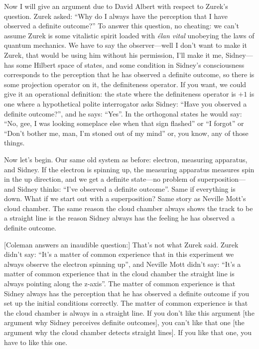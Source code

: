 \documentclass[twocolumn,prb]{revtex4}
\begin{document}
Now I will give an argument due to David Albert\cite{Albert94} with respect to Zurek's question. Zurek asked: ``Why do I always have the perception that I have observed a definite outcome?'' To answer this question, no cheating: we can't assume Zurek is some vitalistic spirit loaded with \emph{élan vital} unobeying the laws of quantum mechanics. We have to say the observer---well I don't want to make it Zurek, that would be using him without his permission, I'll make it me, Sidney---has some Hilbert space of states, and some condition in Sidney's consciousness corresponds to the perception that he has observed a definite outcome, so there is some projection operator on it, the definiteness operator.
If you want, we could give it an operational definition: the state
where the definiteness operator is $+1$ is one where a hypothetical polite interrogator asks Sidney: ``Have you observed a definite outcome?'', and he says: ``Yes''. In the orthogonal states he would say: ``No, gee, I was looking someplace else when that sign flashed'' or ``I forgot'' or ``Don't bother me, man, I'm stoned out of my mind'' or, you know, any of those things.

Now let's begin. Our same old system as before: electron, measuring apparatus, and Sidney. If the electron is spinning up, the measuring apparatus measures spin in the up direction, and we get a definite state---no problem of superposition---and Sidney thinks: ``I've observed a definite outcome''. Same if everything is down. What if we start out with a superposition? Same story as Neville Mott's cloud chamber. The same reason the cloud chamber always shows the track to be a straight line is the reason Sidney always has the feeling he has observed a definite outcome.


[Coleman answers an inaudible question:]
That's not what Zurek said. Zurek didn't say: ``It's a matter of common experience that in this experiment we always observe the electron spinning up'', and Neville Mott didn't say: ``It's a matter of common experience that in the cloud chamber the straight line is always pointing along the z-axis''. The matter of common experience is that Sidney always has the perception that he has observed a definite outcome if you set up the initial conditions correctly. The matter of common experience is that the cloud chamber is always in a straight line. If you don't like this argument [the argument why Sidney perceives definite outcomes], you can't like that one [the argument why the cloud chamber detects straight lines]. If you like that one, you have to like this one.
\end{document}
